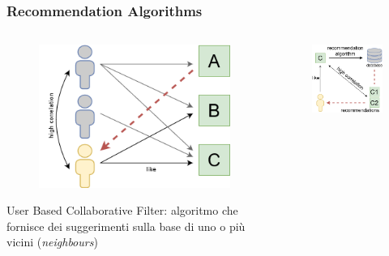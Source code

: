 
\begin{frame}
    \frametitle{Recommendation Algorithms}
    \begin{columns}
        \begin{column}{0.5\textwidth}
            \begin{figure}
                \centering
                \includegraphics[scale=0.5]{images/UB_CF_ex}
           \end{figure}
           \alert{User Based Collaborative Filter}: algoritmo che fornisce dei suggerimenti sulla base di uno o più vicini (\textit{neighbours}) 
        \end{column}
        \begin{column}{0.5\textwidth}
            \begin{figure}
                \centering
                \includegraphics[scale=0.55]{images/IB_CF_ex2}

\end{figure}
\end{column}
\end{columns}
\end{frame}
